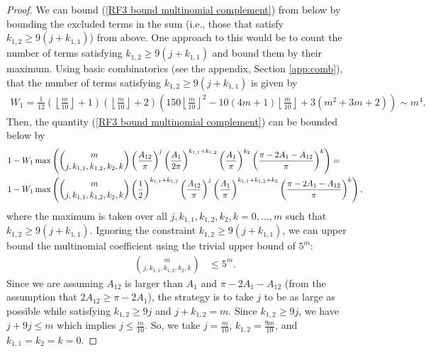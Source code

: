 \documentclass[twoside,11pt]{article}
\newcommand{\edit}[1]{{{#1}}}
\begin{document}
\begin{proof}
We can  bound (\ref{RF3 bound multinomial complement}) from below by  bounding the excluded terms in the sum (i.e., those that satisfy $k_{1,2} \geq 9(j+k_{1,1})$) from above. One approach to this would be to count the number of terms satisfying $k_{1,2} \geq 9(j+k_{1,1})$ and bound them by their maximum.  Using basic combinatorics (see the appendix, Section \ref{app:comb}),
that the number of terms satisfying $k_{1,2} \geq 9(j+k_{1,1})$ is given by
\begin{align} \label{multinomial count}
W_1 = \frac{1}{12} \left(\left\lfloor \frac{m}{10} \right\rfloor + 1\right) \left(\left\lfloor \frac{m}{10} \right\rfloor + 2\right) \left(150 \left\lfloor \frac{m}{10} \right\rfloor^2 - 10(4m + 1)\left\lfloor \frac{m}{10} \right\rfloor +3(m^2 + 3m + 2)\right) \sim m^4.
\end{align}
Then, the quantity (\ref{RF3 bound multinomial complement}) can be bounded below by
\begin{align} 
&1 - W_1 \max\left( \binom{m}{j,k_{1,1},k_{1,2},k_2,k} \left(\frac{A_{12}}{\pi}\right)^j \left(\frac{A_1}{2\pi} \right)^{k_{1,1}+k_{1,2}}   \left(\frac{A_1}{\pi} \right)^{k_2} \left(\frac{\pi-2A_1-A_{12}}{\pi}\right)^k \right) =\notag\\
&1 - W_1 \max\left( \binom{m}{j,k_{1,1},k_{1,2},k_2,k} \left(\frac{1}{2} \right)^{k_{1,1}+k_{1,2}} \left(\frac{A_{12}}{\pi}\right)^j \left(\frac{A_1}{\pi} \right)^{k_{1,1}+k_{1,2}+k_2} \left(\frac{\pi-2A_1-A_{12}}{\pi}\right)^k \right), \label{RF3 bound multinomial estimate}
\end{align}
where the maximum is taken over all $j,k_{1,1},k_{1,2}, k_2, k = 0,\dots,m$ such that $k_{1,2} \geq 9(j+k_{1,1})$.
Ignoring the constraint  $k_{1,2} \geq 9(j+k_{1,1})$, we can upper bound the multinomial coefficient \edit{using the trivial upper bound of $5^m$:}%
\edit{
\begin{align}\label{multinomial bound}
\binom{m}{j,k_{1,1},k_{1,2},k_2,k}  &\leq 5^m. 
\end{align}
}
Since we are assuming $A_{12}$ is larger than $A_1$ and $\pi-2A_1-A_{12}$ \edit{(from the assumption that $2A_{12}\geq \pi - 2A_1$)}, the strategy is to take $j$ to be as large as possible while satisfying $k_{1,2} \geq 9j$ and $j + k_{1,2} = m$. Since $k_{1,2} \geq 9j$, we have $j + 9j \leq m$ which implies $j \leq \frac{m}{10}$. So, we take $j= \frac{m}{10}$, $k_{1,2} = \frac{9m}{10}$, and $k_{1,1} = k_2 = k = 0$. 

\end{proof}
\end{document}
